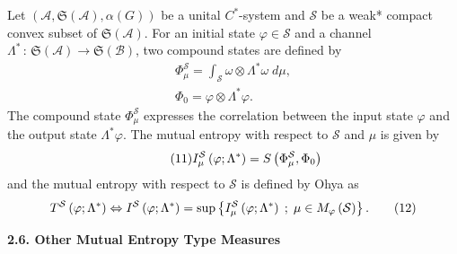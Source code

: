 Let  $  \left( {{\mathcal{A}},\mathfrak{S}(\mathcal{A}),\alpha \left( G\right) }%
\right)  $   be a unital  $  C^{\ast } $-system and  $  {\mathcal{S}} $   be a weak*
compact convex subset of  $  \mathfrak{S}(\mathcal{A}) $. For an initial state  $  %
\varphi \in \mathcal{S} $   and a channel  $  \Lambda ^{\ast }\,:\,\mathfrak{S}%
\left( {\mathcal{A}}\right) \rightarrow \mathfrak{S}\left( {\mathcal{B}}%
\right)  $,   two compound states \cite{nv:-OP, nv:-O2} are defined by%
\begin{gather}
\Phi _{\mu }^{\mathcal{S}} =\int_{\mathcal{S}}\omega \otimes \Lambda
^{\ast }\omega \;d\mu, \tag{9} \\
\Phi _{0} =\varphi \otimes \Lambda ^{\ast }\varphi.
\tag{10}
\end{gather}%
\noindent The compound state  $  \Phi _{\mu }^{\mathcal{S}} $   expresses the
correlation between the input state  $  \varphi  $   and the output state  $  \Lambda
^{\ast }\varphi  $. The mutual entropy with respect to  $  \mathcal{S} $   and  $  \mu 
 $   is given by 
\begin{equation}
\tag{11}
I_{\mu }^{\mathcal{S}}\left( {\varphi ;\Lambda ^{\ast }}\right) =S\left( {%
\Phi _{\mu }^{\mathcal{S}},\Phi _{0}}\right)
\end{equation}%
\noindent and the mutual entropy with respect to  $  \mathcal{S} $   is defined by
Ohya \cite{nv:-OP, nv:-O2}  as 
\begin{equation}
T^{\mathcal{S}}\left( {\varphi ;\Lambda ^{\ast }}\right) \Leftrightarrow I^{%
\mathcal{S}}\left( {\varphi ;\Lambda ^{\ast }}\right) =\sup \left\{ {I_{\mu
}^{\mathcal{S}}\left( {\varphi ;\Lambda ^{\ast }}\right) \;;\;\mu \in
M_{\varphi }\left( {\mathcal{S}}\right) }\right\}.
\tag{12}
\end{equation}


\smallskip

\textbf{2.6. Other Mutual Entropy Type Measures}

